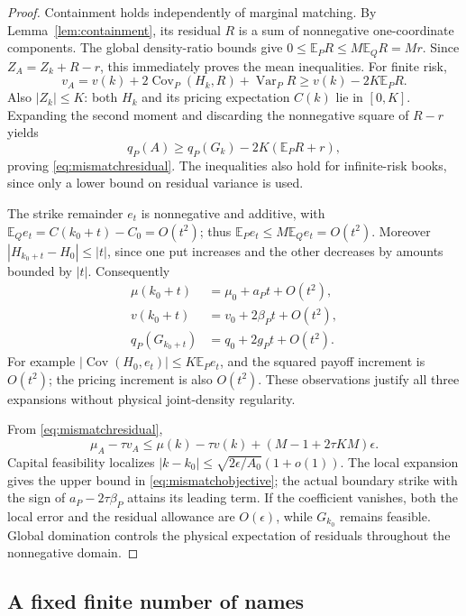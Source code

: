 \documentclass[11pt,a4paper]{amsart}
\theoremstyle{plain}
\theoremstyle{definition}
\theoremstyle{remark}
\DeclareMathOperator{\Var}{Var}
\DeclareMathOperator{\Cov}{Cov}
\newcommand{\EE}{\mathbb{E}}
\begin{document}
\begin{proof}
Containment holds independently of marginal matching. By Lemma~\ref{lem:containment}, its residual $R$ is a sum of nonnegative one-coordinate components. The global density-ratio bounds give
$0\le\EE_PR\le M\EE_QR=Mr$.
Since $Z_A=Z_k+R-r$, this immediately proves the mean inequalities. For finite risk,
\[
 v_A=v(k)+2\Cov_P(H_k,R)+\Var_PR
 \ge v(k)-2K\EE_PR.
\]
Also $|Z_k|\le K$: both $H_k$ and its pricing expectation $C(k)$ lie in $[0,K]$. Expanding the second moment and discarding the nonnegative square of $R-r$ yields
\[
 q_P(A)\ge q_P(G_k)-2K(\EE_PR+r),
\]
proving \eqref{eq:mismatchresidual}. The inequalities also hold for infinite-risk books, since only a lower bound on residual variance is used.

The strike remainder $e_t$ is nonnegative and additive, with $\EE_Qe_t=C(k_0+t)-C_0=O(t^2)$; thus $\EE_Pe_t\le M\EE_Qe_t=O(t^2)$. Moreover $|H_{k_0+t}-H_0|\le|t|$, since one put increases and the other decreases by amounts bounded by $|t|$. Consequently
\begin{align*}
 \mu(k_0+t)&=\mu_0+a_Pt+O(t^2),\\
 v(k_0+t)&=v_0+2\beta_Pt+O(t^2),\\
 q_P(G_{k_0+t})&=q_0+2g_Pt+O(t^2).
\end{align*}
For example $|\Cov(H_0,e_t)|\le K\EE_Pe_t$, and the squared payoff increment is $O(t^2)$; the pricing increment is also $O(t^2)$. These observations justify all three expansions without physical joint-density regularity.

From \eqref{eq:mismatchresidual},
\[
 \mu_A-\tau v_A\le\mu(k)-\tau v(k)
 +(M-1+2\tau KM)\epsilon.
\]
Capital feasibility localizes $|k-k_0|\le\sqrt{2\epsilon/A_0}(1+o(1))$. The local expansion gives the upper bound in \eqref{eq:mismatchobjective}; the actual boundary strike with the sign of $a_P-2\tau\beta_P$ attains its leading term. If the coefficient vanishes, both the local error and the residual allowance are $O(\epsilon)$, while $G_{k_0}$ remains feasible. Global domination controls the physical expectation of residuals throughout the nonnegative domain.
\end{proof}

\subsection{A fixed finite number of names}
\end{document}
